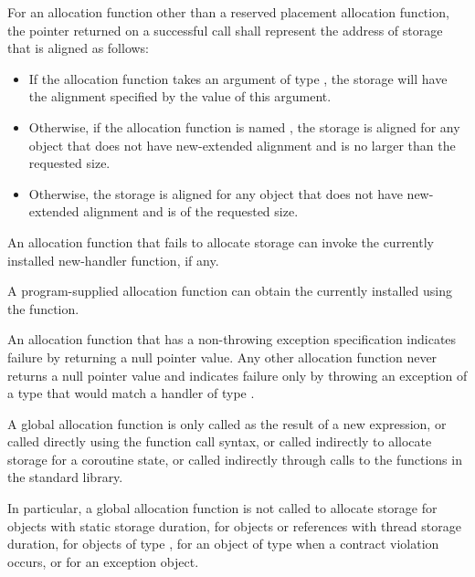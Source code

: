 \pnum
For an allocation function other than
a reserved placement allocation function,
the pointer returned on a successful call
shall represent the address of storage that is aligned as follows:
\begin{itemize}
\item
  If the allocation function takes an argument
  of type ,
  the storage will have the alignment specified
  by the value of this argument.
\item
  Otherwise, if the allocation function is named ,
  the storage is aligned for any object that
  does not have new-extended alignment and
  is no larger than the requested size.
\item
  Otherwise, the storage is aligned for any object that
  does not have new-extended alignment and is of the requested size.
\end{itemize}

\pnum
An allocation function that fails to allocate storage can invoke the
currently installed new-handler function, if any.
\begin{note}
%
A program-supplied allocation function can obtain the
currently installed  using the
 function.
\end{note}
An allocation function that has a non-throwing
exception specification
indicates failure by returning
a null pointer value.
Any other allocation function
never returns a null pointer value and
indicates failure only by throwing an exception of a type
that would match a handler of type
.

\pnum
A global allocation function is only called as the result of a new
expression, or called directly using the function call
syntax, or called indirectly to allocate storage for
a coroutine state,
or called indirectly through calls to the
functions in the \Cpp{} standard library.
\begin{note}
In particular, a
global allocation function is not called to allocate storage
for objects with static storage duration,
for objects or references with thread storage duration,
for objects of type ,
for an object of type 
when a contract violation occurs, or
for an exception object.
\end{note}

